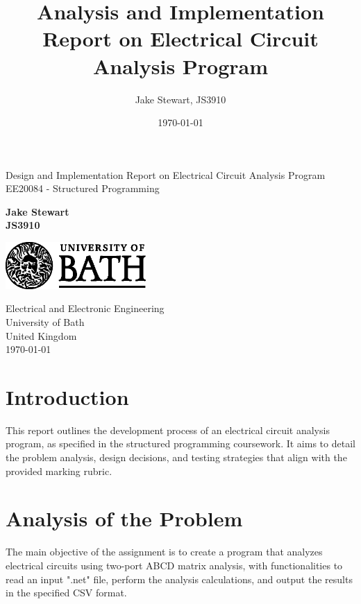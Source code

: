 \documentclass[a4paper]{article}
\title{Analysis and Implementation Report on Electrical Circuit Analysis Program}
\author{Jake Stewart, JS3910}
\date{\today}
\begin{document}
\begin{titlepage}
    \begin{center}
        \vspace*{1cm}

        \Huge
        \textbf{}

        \vspace{0.5cm}
        \LARGE
        Design and Implementation Report on Electrical Circuit Analysis Program\\
        EE20084 - Structured Programming
        
        \vspace{1.5cm}

        \textbf{Jake Stewart}\\
        \textbf{JS3910}\\
        \vspace{0.8cm}

        \vfill
        \includegraphics[width=0.4\textwidth]{university_logo.png}

        \Large
        Electrical and Electronic Engineering\\
        University of Bath\\
        United Kingdom\\
        \today
        

    \end{center}
\end{titlepage}

\newpage

\tableofcontents

\section{Introduction}
This report outlines the development process of an electrical circuit analysis program, as specified 
in the structured programming coursework. It aims to detail the problem analysis, design decisions, 
and testing strategies that align with the provided marking rubric.

\section{Analysis of the Problem}
The main objective of the assignment is to create a program that analyzes 
electrical circuits using two-port ABCD matrix analysis, with functionalities to read an 
input ".net" file, perform the analysis calculations, and output the results in the specified CSV format.
\end{document}
